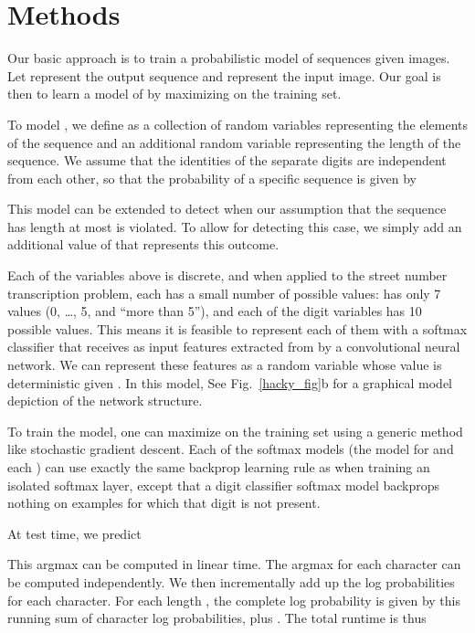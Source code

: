 \documentclass{article} \usepackage{comment}
\begin{document}
\section{Methods}
\label{sec:methods}

Our basic approach is to train a probabilistic model of sequences given images. Let  represent
the output sequence and  represent the input image. Our goal is then to learn a model of 
by maximizing  on the training set.

To model , we define  as a collection of  random variables  representing
the elements of the sequence and an additional random variable  representing the length of the sequence.
We assume that the identities of the separate digits are independent from each other, so that the probability of a specific
sequence  is given by

This model can be extended to
detect when our assumption that
the sequence has length at most  is violated. To allow for detecting this case, we simply add an additional
value of  that represents this outcome.

Each of the variables above is discrete, and when applied to the street number transcription problem, each has a small number
of possible values:  has only 7 values (0, \dots, 5, and ``more than 5''), and each of the digit variables has 10 possible values.
This means it is feasible to represent each of them with a softmax classifier that receives as input
features extracted from  by a convolutional neural network. We can represent these features as a random variable 
whose value is deterministic given . In this model,  See Fig.~\ref{hacky_fig}b for a graphical
model depiction of the network structure.


To train the model, one can maximize  on the training set using a generic method like stochastic
gradient descent. Each of the softmax models (the model for  and each )
can use exactly the same backprop learning rule as when training an isolated softmax layer,
except that a digit classifier softmax model backprops nothing on examples for which that
digit is not present.

At test time, we predict

This argmax can be computed in
linear time. The argmax for each character can be computed independently. We then incrementally add up
the log probabilities for each character. For each length , the complete log probability is given
by this running sum of character log probabilities, plus . The total runtime is thus 
\end{document}
